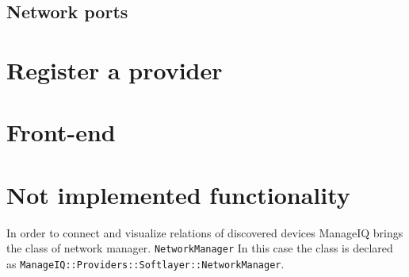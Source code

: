 \subsection{Network ports}
\label{sub:Network ports}

\section{Register a provider}
\label{sec:Register a provider}

\section{Front-end}
\label{sec:Front-end}

\section{Not implemented functionality}
\label{sec:Not implemented functionality}


In order to connect and visualize relations of discovered devices ManageIQ brings the class of network manager. \texttt{NetworkManager} In this case the class is declared as \texttt{ManageIQ::Providers::Softlayer::NetworkManager}.

